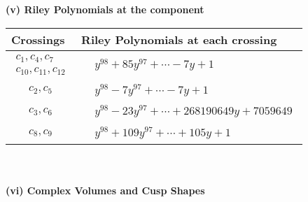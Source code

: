 \documentclass[1p]{elsarticle_modified}
\theoremstyle{definition}
\begin{document}
\newpage\renewcommand{\arraystretch}{1}
\flushleft \textbf{(v) Riley Polynomials at the component}\newline \\
\begin{tabular}{m{50pt}|m{274pt}}
Crossings & \hspace{64pt}Riley Polynomials at each crossing \\
\hline $$\begin{aligned}c_{1},c_{4},c_{7}\\c_{10},c_{11},c_{12}\end{aligned}$$&$\begin{aligned}
&y^{98}+85 y^{97}+\cdots-7 y+1
\end{aligned}$\\
\hline $$\begin{aligned}c_{2},c_{5}\end{aligned}$$&$\begin{aligned}
&y^{98}-7 y^{97}+\cdots-7 y+1
\end{aligned}$\\
\hline $$\begin{aligned}c_{3},c_{6}\end{aligned}$$&$\begin{aligned}
&y^{98}-23 y^{97}+\cdots+268190649 y+7059649
\end{aligned}$\\
\hline $$\begin{aligned}c_{8},c_{9}\end{aligned}$$&$\begin{aligned}
&y^{98}+109 y^{97}+\cdots+105 y+1
\end{aligned}$\\
\hline
\end{tabular}\\~\\
\newpage\flushleft \textbf{(vi) Complex Volumes and Cusp Shapes}
\end{document}
